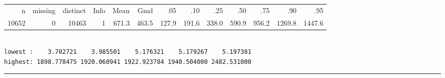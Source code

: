 \begin{spacing}{0.7}
{{{\smaller[2]
\begin{tabular}{ rrrrrrrrrrrrr }
n&missing&distinct&Info&Mean&Gmd&.05&.10&.25&.50&.75&.90&.95 \\
10652&0&10463&1&671.3&463.5& 127.9& 191.6& 338.0& 590.9& 956.2&1269.8&1447.6 \end{tabular}
\begin{verbatim}

lowest :    3.702721    3.985501    5.176321    5.179267    5.197381
highest: 1898.778475 1920.060941 1922.923784 1940.504000 2482.531000
\end{verbatim}
}
\smallskip\hrule\smallskip
}
}\end{spacing}
